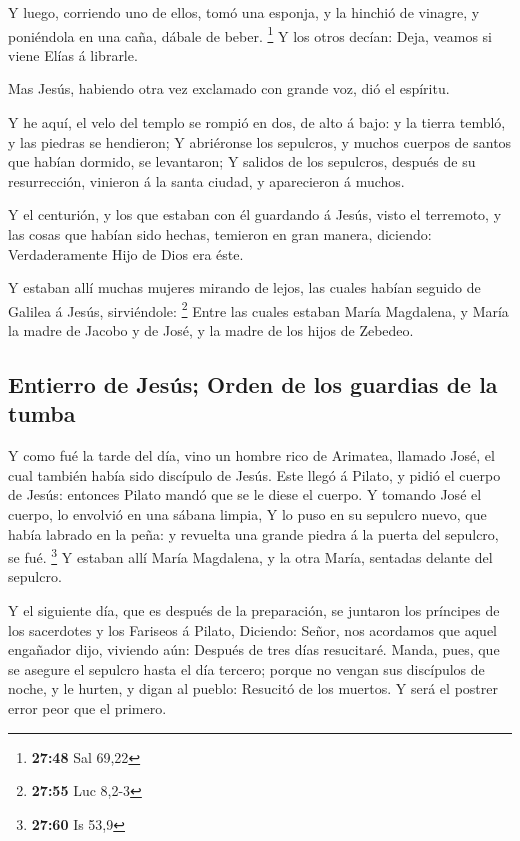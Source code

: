  Y luego, corriendo uno de ellos, tomó una esponja, y la
hinchió de vinagre, y poniéndola en una caña, dábale de beber.
\footnote{\textbf{27:48} Sal 69,22}  Y los otros decían:
Deja, veamos si viene Elías á librarle.

 Mas Jesús, habiendo otra vez exclamado con grande voz,
dió el espíritu.

 Y he aquí, el velo del templo se rompió en dos, de alto
á bajo: y la tierra tembló, y las piedras se hendieron; 
Y abriéronse los sepulcros, y muchos cuerpos de santos que habían
dormido, se levantaron;  Y salidos de los sepulcros,
después de su resurrección, vinieron á la santa ciudad, y aparecieron á
muchos.

 Y el centurión, y los que estaban con él guardando á
Jesús, visto el terremoto, y las cosas que habían sido hechas, temieron
en gran manera, diciendo: Verdaderamente Hijo de Dios era éste.

 Y estaban allí muchas mujeres mirando de lejos, las
cuales habían seguido de Galilea á Jesús, sirviéndole: \footnote{\textbf{27:55}
  Luc 8,2-3}  Entre las cuales estaban María Magdalena, y
María la madre de Jacobo y de José, y la madre de los hijos de Zebedeo.

\hypertarget{entierro-de-jesuxfas-orden-de-los-guardias-de-la-tumba}{%
\subsection{Entierro de Jesús; Orden de los guardias de la
tumba}\label{entierro-de-jesuxfas-orden-de-los-guardias-de-la-tumba}}

 Y como fué la tarde del día, vino un hombre rico de
Arimatea, llamado José, el cual también había sido discípulo de Jesús.
 Este llegó á Pilato, y pidió el cuerpo de Jesús:
entonces Pilato mandó que se le diese el cuerpo.  Y
tomando José el cuerpo, lo envolvió en una sábana limpia,
 Y lo puso en su sepulcro nuevo, que había labrado en la
peña: y revuelta una grande piedra á la puerta del sepulcro, se fué.
\footnote{\textbf{27:60} Is 53,9}  Y estaban allí María
Magdalena, y la otra María, sentadas delante del sepulcro.

 Y el siguiente día, que es después de la preparación, se
juntaron los príncipes de los sacerdotes y los Fariseos á Pilato,
 Diciendo: Señor, nos acordamos que aquel engañador dijo,
viviendo aún: Después de tres días resucitaré.  Manda,
pues, que se asegure el sepulcro hasta el día tercero; porque no vengan
sus discípulos de noche, y le hurten, y digan al pueblo: Resucitó de los
muertos. Y será el postrer error peor que el primero.

